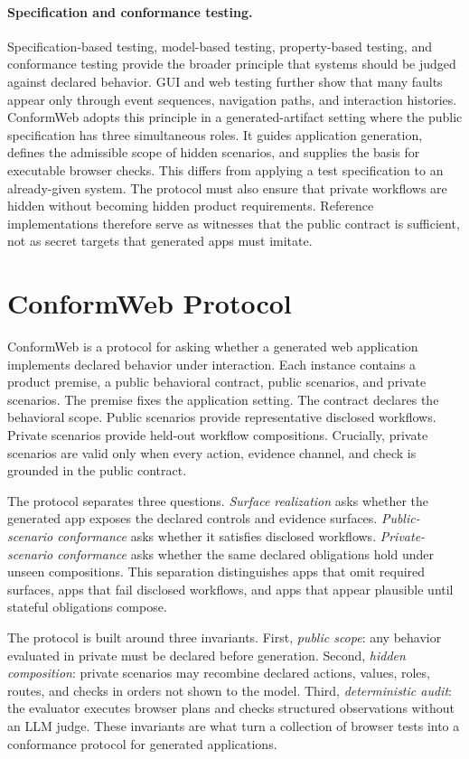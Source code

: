 \paragraph{Specification and conformance testing.}
Specification-based testing, model-based testing, property-based testing, and
conformance testing provide the broader principle that systems should be judged
against declared behavior. GUI and web testing further show that many faults
appear only through event sequences, navigation paths, and interaction
histories. ConformWeb adopts this principle in a generated-artifact setting
where the public specification has three simultaneous roles. It guides
application generation, defines the admissible scope of hidden scenarios, and
supplies the basis for executable browser checks. This differs from applying a
test specification to an already-given system. The protocol must also ensure
that private workflows are hidden without becoming hidden product
requirements. Reference implementations therefore serve as witnesses that the
public contract is sufficient, not as secret targets that generated apps must
imitate.

\section{ConformWeb Protocol}
\label{sec:protocol}

ConformWeb is a protocol for asking whether a generated web application
implements declared behavior under interaction. Each instance contains a
product premise, a public behavioral contract, public scenarios, and private
scenarios. The premise fixes the application setting. The contract declares the
behavioral scope. Public scenarios provide representative disclosed workflows.
Private scenarios provide held-out workflow compositions. Crucially, private
scenarios are valid only when every action, evidence channel, and check is
grounded in the public contract.

The protocol separates three questions. \emph{Surface realization} asks whether
the generated app exposes the declared controls and evidence surfaces.
\emph{Public-scenario conformance} asks whether it satisfies disclosed
workflows. \emph{Private-scenario conformance} asks whether the same declared
obligations hold under unseen compositions. This separation distinguishes apps
that omit required surfaces, apps that fail disclosed workflows, and apps that
appear plausible until stateful obligations compose.

The protocol is built around three invariants. First, \emph{public scope}: any
behavior evaluated in private must be declared before generation. Second,
\emph{hidden composition}: private scenarios may recombine declared actions,
values, roles, routes, and checks in orders not shown to the model. Third,
\emph{deterministic audit}: the evaluator executes browser plans and checks
structured observations without an LLM judge. These invariants are what turn a
collection of browser tests into a conformance protocol for generated
applications.

